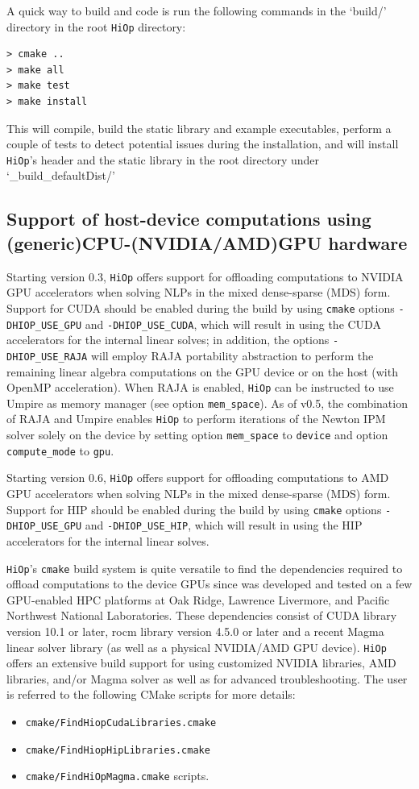 \documentclass[11pt]{article}
\newcounter{line}
\newcommand{\Hi}{\texttt{HiOp}\xspace}
\begin{document}
A quick way to build and code is run the following commands in the `build\//' directory in the root \Hi directory: 
\begin{verbatim}
> cmake ..
> make all
> make test
> make install
\end{verbatim}
This will compile, build the static library and example executables, perform a couple of tests to detect potential issues during the installation, and will install \Hi's header and the static library in the root directory under `\_build\_defaultDist\//'

\subsection{Support of host-device computations using (generic)CPU-(NVIDIA/AMD)GPU hardware}

Starting version 0.3, \Hi offers support for offloading computations to NVIDIA GPU accelerators when solving NLPs in the mixed dense-sparse (MDS) form. Support for CUDA should be enabled during the build by using \texttt{cmake} options \texttt{-DHIOP\_USE\_GPU}  and \texttt{-DHIOP\_USE\_CUDA}, which will result in using the CUDA accelerators for the internal linear solves; in addition, the options \texttt{-DHIOP\_USE\_RAJA} will employ RAJA portability abstraction to perform the remaining linear algebra computations on the GPU device or on the host (with OpenMP acceleration). When RAJA is enabled, \Hi can be instructed to use Umpire as memory manager (see option \texttt{mem\_space}). As of v0.5, the combination of RAJA and Umpire enables \Hi to perform iterations of the Newton IPM solver solely on the device by setting option \texttt{mem\_space} to \texttt{device} and option \texttt{compute\_mode} to \texttt{gpu}.

Starting version 0.6, \Hi offers support for offloading computations to AMD GPU accelerators when solving NLPs in the mixed dense-sparse (MDS) form. Support for HIP should be enabled during the build by using \texttt{cmake} options \texttt{-DHIOP\_USE\_GPU}  and \texttt{-DHIOP\_USE\_HIP}, which will result in using the HIP accelerators for the internal linear solves.

\Hi's \texttt{cmake} build system is quite versatile to find the dependencies required to offload computations to the device GPUs since was developed and tested on a few GPU-enabled HPC platforms at Oak Ridge, Lawrence Livermore, and Pacific Northwest National Laboratories. These dependencies consist of CUDA library version 10.1 or later, rocm library version 4.5.0 or later and a recent Magma linear solver library (as well as a physical NVIDIA/AMD GPU device). \Hi offers an extensive build support for using customized NVIDIA libraries, AMD libraries, and/or Magma solver as well as for advanced troubleshooting. The user is referred to the following CMake scripts for more details:
\begin{itemize}
\item \texttt{cmake/FindHiopCudaLibraries.cmake}
\item \texttt{cmake/FindHiopHipLibraries.cmake}
\item \texttt{cmake/FindHiOpMagma.cmake} scripts.
\end{itemize}
\end{document}
